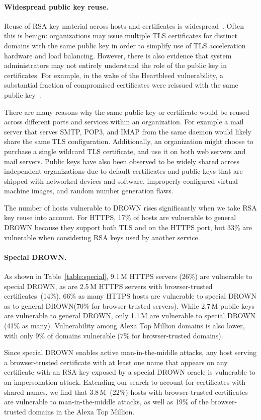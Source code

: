 \paragraph{Widespread public key reuse.}
Reuse of RSA key material across hosts and certificates is
widespread~\cite{mail-tls-holz-2016,weak-keys-2012}. Often this is benign:
organizations may issue multiple TLS certificates for distinct domains with
the same public key in order to simplify use of TLS acceleration hardware and
load balancing. However, there is also evidence that system administrators
may not entirely understand the role of the public key in certificates. For
example, in the wake of the Heartbleed vulnerability, a substantial fraction
of compromised certificates were reissued with the same public
key~\cite{heartbleed-2014}.

There are many reasons why the same public key or certificate would be reused
across different ports and services within an organization. For example a
mail server that serves SMTP, POP3, and IMAP from the same daemon would
likely share the same TLS configuration. Additionally, an organization might
choose to purchase a single wildcard TLS certificate, and use it on both web
servers and mail servers. Public keys have also been observed to be widely
shared across independent organizations due to default certificates and
public keys that are shipped with networked devices and software, improperly
configured virtual machine images, and random number generation flaws.

The number of hosts vulnerable to DROWN rises significantly when we take RSA
key reuse into account. For HTTPS, 17\% of hosts are vulnerable to general
DROWN because they support both TLS and \ssltwo on the HTTPS port, but 33\%
are vulnerable when considering RSA keys used by another service.

\paragraph{Special DROWN\@.}
As shown in Table~\ref{table:special},
9.1\,M HTTPS servers (26\%) are
vulnerable to special DROWN, as are 2.5\,M HTTPS servers with browser-trusted
certificates~(14\%). 66\% as many HTTPS hosts are vulnerable to special DROWN
as to general DROWN\@ (70\% for browser-trusted servers). While 2.7\,M public
keys are vulnerable to general DROWN, only 1.1\,M are vulnerable to special DROWN
(41\% as many). Vulnerability among Alexa Top Million domains is also lower, with
only 9\% of domains vulnerable (7\% for browser-trusted domains).

Since special DROWN enables active man-in-the-middle attacks, any host serving
a browser-trusted certificate with at least one name that appears on any
certificate with an RSA key exposed by a special DROWN oracle is vulnerable to an
impersonation attack. Extending our search to account for certificates with
shared names, we find that 3.8\,M~(22\%) hosts with browser-trusted certificates
are vulnerable to man-in-the-middle attacks, as well as 19\% of the
browser-trusted domains in the Alexa Top Million.
